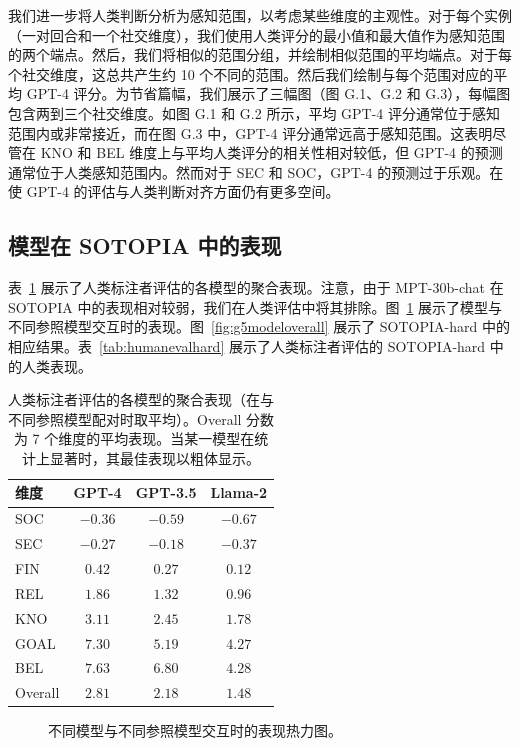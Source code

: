 \documentclass[11pt,a4paper]{article}
\begin{document}
我们进一步将人类判断分析为感知范围，以考虑某些维度的主观性。对于每个实例（一对回合和一个社交维度），我们使用人类评分的最小值和最大值作为感知范围的两个端点。然后，我们将相似的范围分组，并绘制相似范围的平均端点。对于每个社交维度，这总共产生约 10 个不同的范围。然后我们绘制与每个范围对应的平均 GPT-4 评分。为节省篇幅，我们展示了三幅图（图 G.1、G.2 和 G.3），每幅图包含两到三个社交维度。如图 G.1 和 G.2 所示，平均 GPT-4 评分通常位于感知范围内或非常接近，而在图 G.3 中，GPT-4 评分通常远高于感知范围。这表明尽管在 KNO 和 BEL 维度上与平均人类评分的相关性相对较低，但 GPT-4 的预测通常位于人类感知范围内。然而对于 SEC 和 SOC，GPT-4 的预测过于乐观。在使 GPT-4 的评估与人类判断对齐方面仍有更多空间。

\subsection{模型在 SOTOPIA 中的表现}

表~\ref{tab:g3modeloverall} 展示了人类标注者评估的各模型的聚合表现。注意，由于 MPT-30b-chat 在 SOTOPIA 中的表现相对较弱，我们在人类评估中将其排除。图~\ref{fig:g4modeloverall} 展示了模型与不同参照模型交互时的表现。图~\ref{fig:g5modeloverall} 展示了 SOTOPIA-hard 中的相应结果。表~\ref{tab:humanevalhard} 展示了人类标注者评估的 SOTOPIA-hard 中的人类表现。

\begin{table}[htbp]
\centering
\small
\begin{tabular}{lccc}
\toprule
维度 & GPT-4 & GPT-3.5 & Llama-2 \\
\midrule
SOC & $-0.36$ & $-0.59$ & $-0.67$ \\
SEC & $-0.27$ & $-0.18$ & $-0.37$ \\
FIN & $\mathbf{0.42}$ & $0.27$ & $0.12$ \\
REL & $\mathbf{1.86}$ & $1.32$ & $0.96$ \\
KNO & $\mathbf{3.11}$ & $2.45$ & $1.78$ \\
GOAL & $\mathbf{7.30}$ & $5.19$ & $4.27$ \\
BEL & $\mathbf{7.63}$ & $6.80$ & $4.28$ \\
Overall & $\mathbf{2.81}$ & $2.18$ & $1.48$ \\
\bottomrule
\end{tabular}
\caption{人类标注者评估的各模型的聚合表现（在与不同参照模型配对时取平均）。Overall 分数为 7 个维度的平均表现。当某一模型在统计上显著时，其最佳表现以粗体显示。}
\label{tab:g3modeloverall}
\end{table}

\begin{figure}[htbp]
\centering
{}
\caption{不同模型与不同参照模型交互时的表现热力图。}
\label{fig:g4modeloverall}
\end{figure}
\end{document}
